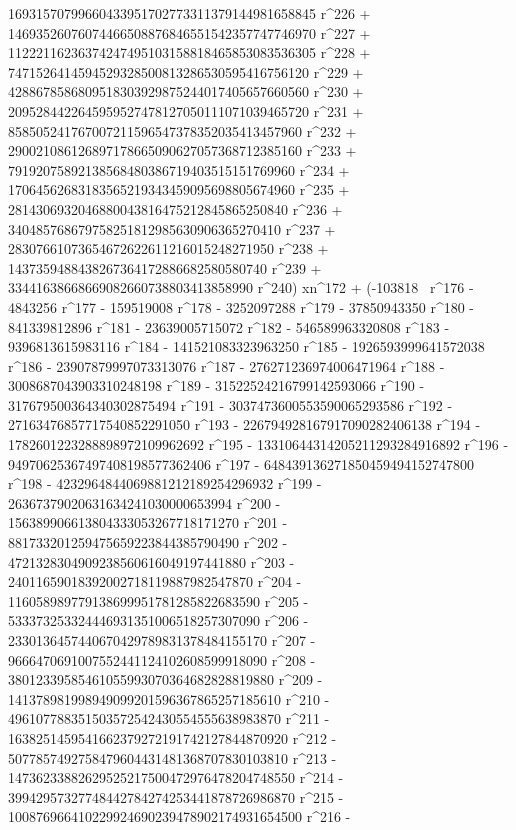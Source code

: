        16931570799660433951702773311379144981658845 r^226 + 
       14693526076074466508876846551542357747746970 r^227 + 
       11222116236374247495103158818465853083536305 r^228 + 
       7471526414594529328500813286530595416756120 r^229 + 
       4288678586809518303929875244017405657660560 r^230 + 
       2095284422645959527478127050111071039465720 r^231 + 
       858505241767007211596547378352035413457960 r^232 + 
       290021086126897178665090627057368712385160 r^233 + 
       79192075892138568480386719403515151769960 r^234 + 
       17064562683183565219343459095698805674960 r^235 + 
       2814306932046880043816475212845865250840 r^236 + 
       340485768679758251812985630906365270410 r^237 + 
       28307661073654672622611216015248271950 r^238 + 
       1437359488438267364172886682580580740 r^239 + 
       33441638668669082660738803413858990 r^240) xn^172 + (-103818 \
r^176 - 4843256 r^177 - 159519008 r^178 - 3252097288 r^179 - 
       37850943350 r^180 - 841339812896 r^181 - 
       23639005715072 r^182 - 546589963320808 r^183 - 
       9396813615983116 r^184 - 141521083323963250 r^185 - 
       1926593999641572038 r^186 - 23907879997073313076 r^187 - 
       276271236974006471964 r^188 - 3008687043903310248198 r^189 - 
       31522524216799142593066 r^190 - 
       317679500364340302875494 r^191 - 
       3037473600553590065293586 r^192 - 
       27163476857717540852291050 r^193 - 
       226794928167917090282406138 r^194 - 
       1782601223288898972109962692 r^195 - 
       13310644314205211293284916892 r^196 - 
       94970625367497408198577362406 r^197 - 
       648439136271850459494152747800 r^198 - 
       4232964844069881212189254296932 r^199 - 
       26367379020631634241030000653994 r^200 - 
       156389906613804333053267718171270 r^201 - 
       881733201259475659223844385790490 r^202 - 
       4721328304909238560616049197441880 r^203 - 
       24011659018392002718119887982547870 r^204 - 
       116058989779138699951781285822683590 r^205 - 
       533373253324446931351006518257307090 r^206 - 
       2330136457440670429789831378484155170 r^207 - 
       9666470691007552441124102608599918090 r^208 - 
       38012339585461055993070364682828819880 r^209 - 
       141378981998949099201596367865257185610 r^210 - 
       496107788351503572542430554555638983870 r^211 - 
       1638251459541662379272191742127844870920 r^212 - 
       5077857492758479604431481368707830103810 r^213 - 
       14736233882629525217500472976478204748550 r^214 - 
       39942957327748442784274253441878726986870 r^215 - 
       100876966410229924690239478902174931654500 r^216 - 
